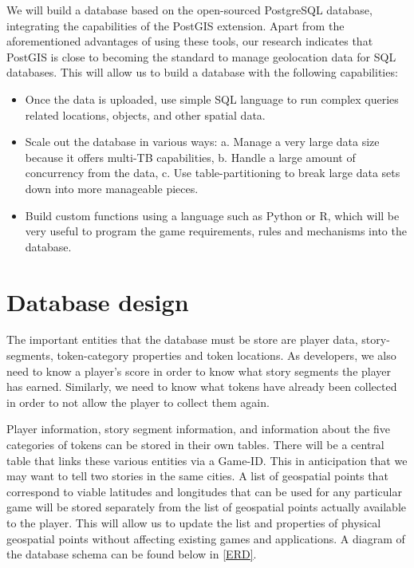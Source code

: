 \documentclass[conference]{IEEEtran}
\begin{document}
We will build a database based on the open-sourced PostgreSQL database, integrating the capabilities of the PostGIS extension. Apart from the aforementioned advantages of using these tools, our research indicates that PostGIS is close to becoming the standard to manage geolocation data for SQL databases.  This will allow us to build a database with the following capabilities:
\begin{itemize}
\item	Once the data is uploaded, use simple SQL language to run complex queries related locations, objects, and other spatial data. 
\item Scale out the database in various ways: a. Manage a very large data size because it offers multi-TB capabilities, b. Handle a large amount of concurrency from the data, c. Use table-partitioning to break large data sets down into more manageable pieces.
\item Build custom functions using a language such as Python or R, which will be very useful to program the game requirements, rules and mechanisms into the database. 
\end{itemize}

\section{Database design}

The important entities that the database must be store are player data, story-segments, token-category properties and token locations. As developers, we also need to know a player’s score in order to know what story segments the player has earned. Similarly, we need to know what tokens have already been collected in order to not allow the player to collect them again. 

Player information, story segment information, and information about the five categories of tokens can be stored in their own tables. There will be a central table that links these various entities via a Game-ID. This in anticipation that we may want to tell two stories in the same cities. A list of geospatial points that correspond to viable latitudes and longitudes that can be used for any particular game will be stored separately from the list of geospatial points actually available to the player. This will allow us to update the list and properties of physical geospatial points without affecting existing games and applications. A diagram of the database schema can be found below in \autoref{ERD}. 
\end{document}
